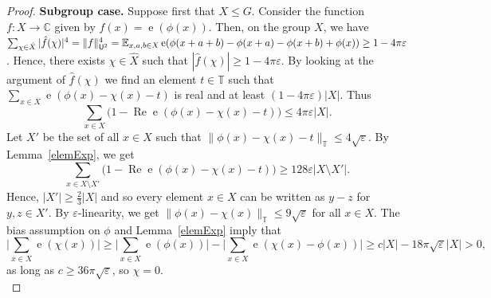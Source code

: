 \documentclass[a4paper,11pt]{article}
\numberwithin{theorem}{section}
\theoremstyle{definition}
\newcommand{\on}[1]{
	\operatorname{#1}
}
\newcommand{\exx}{
  \mathop{
    \mathchoice{\vcenter{\hbox{\larger[4]$\mathbb{E}$}}}
               {\kern0pt\mathbb{E}}
               {\kern0pt\mathbb{E}}
               {\kern0pt\mathbb{E}}
  }\displaylimits
}
\begin{document}
\begin{proof}
\textbf{Subgroup case.} Suppose first that $X \leq G$. Consider the function $f : X \to \mathbb{C}$ given by $f(x) = \on{e}(\phi(x))$. Then, on the group $X$, we have $\sum_{\chi \in \hat{X}} |\hat{f}(\chi)|^4 = \|f\|_{\mathsf{U}^2}^4 = \exx_{x, a, b \in X} \on{e}(\phi(x + a + b) - \phi(x + a) - \phi(x + b) + \phi(x)) \geq 1 - 4 \pi \varepsilon$. Hence, there exists $\chi \in \hat{X}$ such that $|\hat{f}(\chi)| \geq 1 - 4 \pi \varepsilon$. By looking at the argument of $\hat{f}(\chi)$ we find an element $t \in \mathbb{T}$ such that $\sum_{x \in X}\on{e}(\phi(x) - \chi(x) - t)$ is real and at least $(1 - 4 \pi \varepsilon)|X|$. Thus
\[\sum_{x \in X}\Big( 1 - \on{Re}\on{e}(\phi(x) - \chi(x) - t)\Big) \leq 4 \pi \varepsilon |X|.\]
Let $X'$ be the set of all $x \in X$ such that $\|\phi(x) - \chi(x) - t\|_{\mathbb{T}} \leq 4\sqrt{\varepsilon} $. By Lemma~\ref{elemExp}, we get
\[\sum_{x \in X \setminus X'}\Big( 1 - \on{Re}\on{e}(\phi(x) - \chi(x) - t)\Big) \geq 128 \varepsilon |X \setminus X'|.\]
Hence, $|X'| \geq \frac{2}{3}|X|$ and so every element $x \in X$ can be written as $y - z$ for $y,z \in X'$. By $\varepsilon$-linearity, we get $\|\phi(x) - \chi(x)\|_{\mathbb{T}} \leq 9\sqrt{\varepsilon}$ for all $x \in X$. The bias assumption on $\phi$ and Lemma~\ref{elemExp} imply that 
\[\Big|\sum_{x \in X} \on{e}(\chi(x))\Big| \geq \Big|\sum_{x \in X} \on{e}(\phi(x))\Big|  - \Big|\sum_{x \in X} \on{e}(\chi(x) - \phi(x))\Big| \geq c |X| - 18 \pi \sqrt{\varepsilon}|X|  > 0,\] 
as long as $c \geq 36 \pi \sqrt{\varepsilon}$, so $\chi = 0$.\\


\end{proof}
\end{document}
